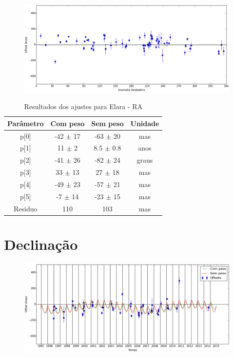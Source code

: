 \documentclass[11pt,a4paper]{report}
\begin{document}
\begin{figure}[h]
\includegraphics[scale=0.45]{Elara/RA_anom.png}  
\end{figure}

\begin{table}[h!]
\caption{\label{Tab: Elara-RA} Resultados dos ajustes para Elara - RA}
\begin{centering}
\begin{tabular}{cccc}
\hline
\hline
Parâmetro & Com peso & Sem peso & Unidade\tabularnewline
\hline
p[0] & -42 $\pm$ 17 & -63 $\pm$ 20 & mas\\
p[1] & 11 $\pm$ 2 & 8.5 $\pm$ 0.8 & anos\\
p[2] & -41 $\pm$ 26 & -82 $\pm$ 24 & graus\\
p[3] & 33 $\pm$ 13 & 27 $\pm$ 18 & mas\\
p[4] & -49 $\pm$ 23 & -57 $\pm$ 21 & mas\\
p[5] & -7 $\pm$ 14 & -23 $\pm$ 15 & mas\\
Residuo & 110 & 103 & mas\\
\hline 
\end{tabular} 
\par\end{centering}
\end{table}

\section*{Declinação}

\begin{figure}[h]
\includegraphics[scale=0.45]{Elara/DEC.png} 
\end{figure}
\end{document}
